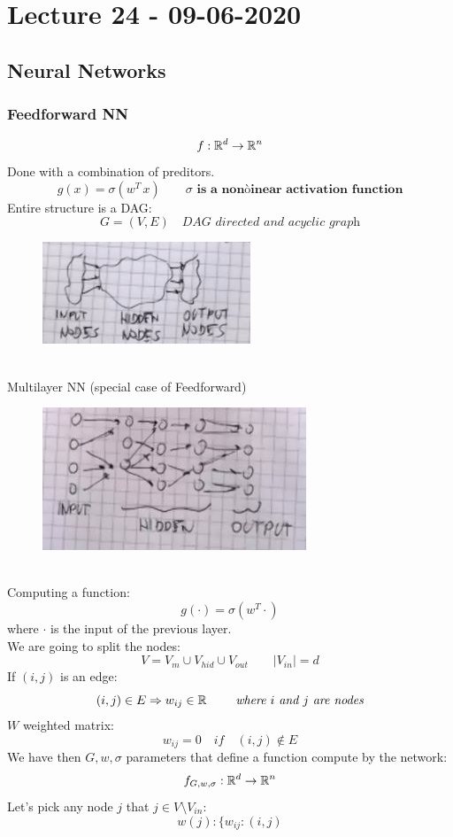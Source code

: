 \documentclass[../main.tex]{subfiles}
\begin{document}
\chapter{Lecture 24 - 09-06-2020}
\section{Neural Networks}

\subsection{Feedforward NN}
$$
f : \mathbb{R}^d \rightarrow \mathbb{R}^n
$$
Done with a combination of preditors.
$$
g(x) = \sigma(w^T \, x) \qquad \textbf{$\sigma$ is  a nonòinear activation function}
$$
Entire structure is a DAG:
$$
G= (V,E) \quad DAG \textit{  directed and acyclic graph}
$$
\begin{figure}[h]
    \centering
    \includegraphics[width=0.3\linewidth]{../img/lez24-img1.JPG}
    \caption{}
\end{figure}\\
Multilayer NN (special case of Feedforward)
\begin{figure}[h]
    \centering
    \includegraphics[width=0.3\linewidth]{../img/lez24-img2.JPG}
    \caption{}
\end{figure}\\
Computing a function:
$$ g(\cdot) = \sigma(w^T \cdot)$$
where $\cdot$ is the input of the previous layer.
\\ 
We are going to split the nodes:
$$
V = V_m \cup V_{hid} \cup V_{out} \qquad |V_{in}| = d
$$
If $(i,j)$ is an edge:
$$
(i,j) \in E \Rightarrow w_{ij} \in \mathbb{R} \qquad \textit{ where $i$ and $j$ are nodes}
$$
$W$ weighted matrix:
$$
w_{ij}= 0 \quad if \quad (i,j) \not \in E
$$
We have then $G,w, \sigma$ parameters that define a function compute by the network:
$$
f_{G,w,\sigma} : \mathbb{R}^d \rightarrow \mathbb{R}^n
$$
Let's pick any node $j$ that $ j \in V \setminus V_{in}$:
$$
w(j) : \{ w_{ij} : (i,j)
$$
\end{document}
